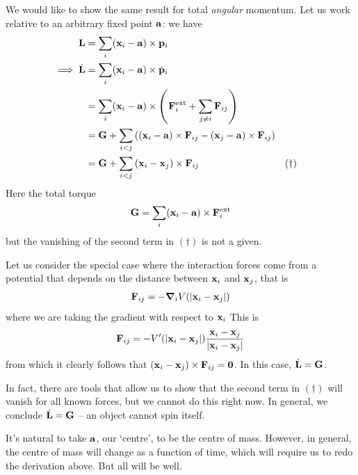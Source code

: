 \documentclass{../../template/note}
\begin{document}
    We would like to show the same result for total \emph{angular} momentum. Let us work relative to an arbitrary fixed point \(\V a\): we have
    \begin{align*}
        \V L &= \sum_i (\V x_i - \V a) \times \V p_i \\
        \implies \dot{\V L} &= \sum_i (\V x_i - \V a) \times \dot{\V p}_i \\
        &= \sum_i (\V x_i - \V a) \times \left(\V F_i^\text{ext} + \sum_{j \neq i}\V F_{ij}\right) \\
        &= \V G + \sum_{i < j}\left((\V x_i - \V a) \times \V F_{ij} - (\V x_j - \V a) \times \V F_{ij} \right) \\
        &= \V G + \sum_{i < j}\left(\V x_i - \V x_j\right)\times\V F_{ij} && (\dagger)
    \end{align*}
    Here the total torque 
    \begin{align*}
        \V G = \sum_i (\V x_i - \V a) \times \V F_i^\text{ext}
    \end{align*}
    but the vanishing of the second term in \((\dagger)\) is not a given.  
    
    Let us consider the special case where the interaction forces come from a potential that depends on the distance between \(\V x_i\) and \(\V x_j\), that is
    \begin{align*}
        \V F_{ij} = -\grad_i V(|\V x_i - \V x_j|)
    \end{align*}
    where we are taking the gradient with respect to \(\V x_i\) This is
    \begin{align*}
        \V F_{ij} = -V'(|\V x_i - \V x_j|)\frac{\V x_i - \V x_j}{|\V x_i - \V x_j|}
    \end{align*}
    from which it clearly follows that \((\V x_i - \V x_j) \times \V F_{ij} = \vec 0\). In this case, \(\dot{\V L} = \V G\).

    In fact, there are tools that allow us to show that the second term in \((\dagger)\) will vanish for all known forces, but we cannot do this right now. In general, we conclude \(\dot{\V L} = \V G\) -- an object cannot spin itself.

    It's natural to take \(\V a\), our `centre', to be the centre of mass. However, in general, the centre of mass will change as a function of time, which will require us to redo the derivation above. But all will be well.
\end{document}
